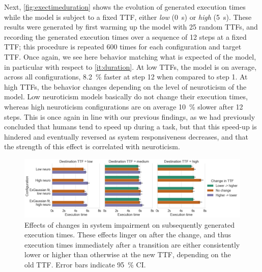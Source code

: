 Next, \cref{fig:exectimeduration} shows the evolution of generated execution times while the model is subject to a fixed \ac{TTF}, either \emph{low} (\SI{0}{\second}) or \emph{high} (\SI{5}{\second}).
These results were generated by first warming up the model with \num{25} random \acp{TTF}, and recording the generated execution times over a sequence of \num{12} steps at a fixed \ac{TTF}; this procedure is repeated \num{600} times for each configuration and target \ac{TTF}.
Once again, we see here behavior matching what is expected of the model, in particular with respect to \cref{it:duration}.
At low \acp{TTF}, the model is on average, across all configurations, \SI{8.2}{\percent} faster at step \num{12} when compared to step \num{1}.
At high \acp{TTF}, the behavior changes depending on the level of neuroticism of the model.
Low neuroticism models basically do not change their execution times, whereas high neuroticism configurations are on average \SI{10}{\percent} slower after \num{12} steps.
This is once again in line with our previous findings, as we had previously concluded that humans tend to speed up during a task, but that this speed-up is hindered and eventually reversed as system responsiveness decreases, and that the strength of this effect is correlated with neuroticism.

\begin{figure}
    \centering
    \includegraphics[width=\textwidth]{figs/new_model/transitions.png}
    \caption{%
        Effects of changes in system impairment on subsequently generated execution times.
        These effects linger on after the change, and thus execution times immediately after a transition are either consistently lower or higher than otherwise at the new \ac{TTF}, depending on the old \ac{TTF}.
        Error bars indicate \SI{95}{\percent} \ac{CI}.
    }\label{fig:transitions}
\end{figure}

